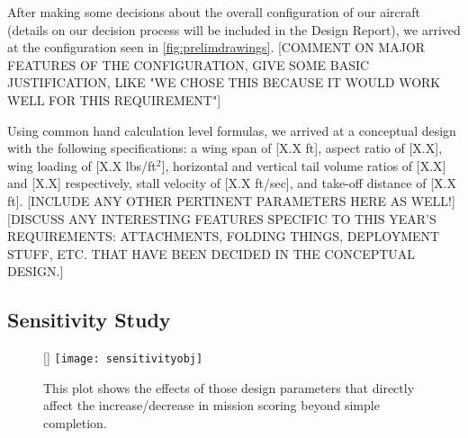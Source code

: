 \documentclass[proposal]{byu-aero}
\begin{document}

After making some decisions about the overall configuration of our aircraft (details on our decision process will be included in the Design Report), we arrived at the configuration seen in \cref{fig:prelimdrawings}.
{\color{BYUred}[COMMENT ON MAJOR FEATURES OF THE CONFIGURATION, GIVE SOME BASIC JUSTIFICATION, LIKE "WE CHOSE THIS BECAUSE IT WOULD WORK WELL FOR THIS REQUIREMENT"]}

Using common hand calculation level formulas, we arrived at a conceptual design with the following specifications: a wing span of {\color{BYUred} [X.X ft]}, aspect ratio of {\color{BYUred} [X.X]}, wing loading of {\color{BYUred} [X.X lbs/ft$^2$]}, horizontal and vertical tail volume ratios of {\color{BYUred} [X.X]} and {\color{BYUred} [X.X]} respectively, stall velocity of {\color{BYUred} [X.X ft/sec]}, and take-off distance of {\color{BYUred} [X.X ft]}.  {\color{BYUred}[INCLUDE ANY OTHER PERTINENT PARAMETERS HERE AS WELL!]}
{\color{BYUred}[DISCUSS ANY INTERESTING FEATURES SPECIFIC TO THIS YEAR'S REQUIREMENTS: ATTACHMENTS, FOLDING THINGS, DEPLOYMENT STUFF, ETC. THAT HAVE BEEN DECIDED IN THE CONCEPTUAL DESIGN.]}
\lipsum[1]



\subsection{Sensitivity Study}
\label{ssec:SensitivityStudy}

\begin{figure}
	\centering
		\raisebox{0pt}[\dimexpr{}\baselineskip\relax]{
	\texttt{[image: sensitivityobj]}
		}
	\caption{This plot shows the effects of those design parameters that directly affect the increase/decrease in mission scoring beyond simple completion.}
	\label{fig:sensitivity}
\end{figure}
\end{document}
